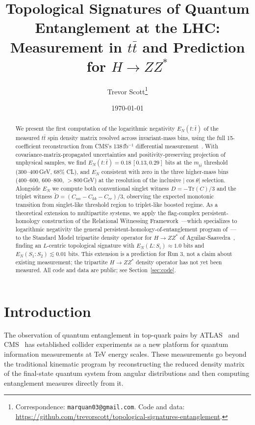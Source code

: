 \documentclass[11pt,a4paper]{article}
\title{Topological Signatures of Quantum Entanglement at the LHC: Measurement in \texorpdfstring{$t\bar{t}$}{ttbar} and Prediction for \texorpdfstring{$H \to ZZ^*$}{H to ZZ*}}
\author{Trevor Scott\thanks{Correspondence: \texttt{marquan03@gmail.com}. Code and data: \url{https://github.com/trevorscott/topological-signatures-entanglement}.}}
\date{\today}
\theoremstyle{definition}
\begin{document}
\maketitle

\begin{abstract}
We present the first computation of the logarithmic negativity $E_N(t{:}\bar{t})$ of the measured $t\bar{t}$ spin density matrix resolved across invariant-mass bins, using the full 15-coefficient reconstruction from CMS's 138\,fb$^{-1}$ differential measurement~\cite{CMS2024}. With covariance-matrix-propagated uncertainties and positivity-preserving projection of unphysical samples, we find $E_N(t{:}\bar{t}) = 0.18\,[0.13, 0.29]$ bits at the $m_{t\bar{t}}$ threshold (300--400\,GeV, 68\% CL), and $E_N$ consistent with zero in the three higher-mass bins (400--600, 600--800, $>$800\,GeV) at the resolution of the inclusive $|\cos\theta|$ selection. Alongside $E_N$ we compute both conventional singlet witness $D = -\text{Tr}(C)/3$ and the triplet witness $\tilde{D} = (C_{nn} - C_{kk} - C_{rr})/3$, observing the expected monotonic transition from singlet-like threshold region to triplet-like boosted regime. As a theoretical extension to multipartite systems, we apply the flag-complex persistent-homology construction of the Relational Witnessing Framework~\cite{Scott2026RWF}---which specializes to logarithmic negativity the general persistent-homology-of-entanglement program of~\cite{DiPierro2018, Mengoni2019, Olsthoorn2023, HamiltonLeditzky2024, Spellman2025}---to the Standard Model tripartite density operator for $H \to ZZ^*$ of Aguilar-Saavedra~\cite{AS2024}, finding an $L$-centric topological signature with $E_N(L{:}S_i) \approx 1.0$ bits and $E_N(S_1{:}S_2) \lesssim 0.01$ bits. This extension is a prediction for Run 3, not a claim about existing measurement; the tripartite $H \to ZZ^*$ density operator has not yet been measured. All code and data are public; see Section~\ref{sec:code}.
\end{abstract}

\section{Introduction}

The observation of quantum entanglement in top-quark pairs by ATLAS~\cite{ATLAS2024} and CMS~\cite{CMS2024, CMS2024entangle} has established collider experiments as a new platform for quantum information measurements at TeV energy scales. These measurements go beyond the traditional kinematic program by reconstructing the reduced density matrix of the final-state quantum system from angular distributions and then computing entanglement measures directly from it.
\end{document}
